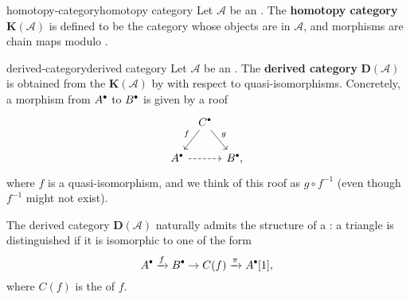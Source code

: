 \begin{topic}{homotopy-category}{homotopy category}
    Let $\mathcal{A}$ be an . The \textbf{homotopy category} $\textbf{K}(\mathcal{A})$ is defined to be the category whose objects are  in $\mathcal{A}$, and morphisms are chain maps modulo .
\end{topic}

\begin{topic}{derived-category}{derived category}
    Let $\mathcal{A}$ be an . The \textbf{derived category} $\textbf{D}(\mathcal{A})$ is obtained from the  $\textbf{K}(\mathcal{A})$ by  with respect to quasi-isomorphisms. Concretely, a morphism from $A^\bdot$ to $B^\bdot$ is given by a roof
    \[ \begin{tikzcd}[column sep = 0.5em] & \arrow[swap]{ld}{f} C^\bdot \arrow{rd}{g} & \\ A^\bdot \arrow[dashed]{rr} & & B^\bdot , \end{tikzcd} \]
    where $f$ is a quasi-isomorphism, and we think of this roof as $g \circ f^{-1}$ (even though $f^{-1}$ might not exist).
    
    The derived category $\textbf{D}(\mathcal{A})$ naturally admits the structure of a : a triangle is distinguished if it is isomorphic to one of the form
    \[ A^\bdot \xrightarrow{f} B^\bdot \to C(f) \xrightarrow{\pi} A^\bdot[1] , \]
    where $C(f)$ is the  of $f$.
\end{topic}

